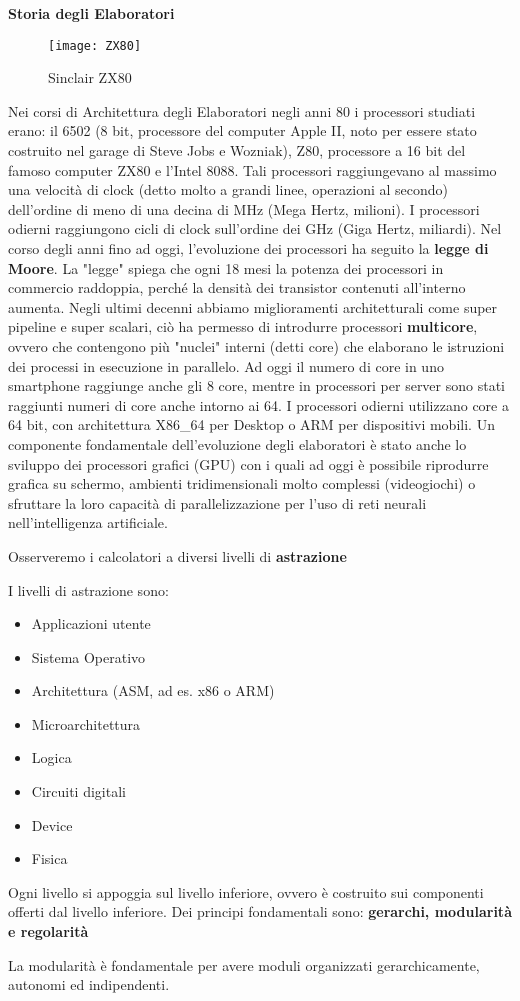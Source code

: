 \begin{note}
	\textbf{Storia degli Elaboratori}\\
	
	\begin{figure}
		\centering
		\caption{Sinclair ZX80}
		\texttt{[image: ZX80]}
	\end{figure}
	
	Nei corsi di Architettura degli Elaboratori negli anni 80 i processori studiati erano: il 6502 (8 bit, processore del computer Apple II, noto per essere stato costruito nel garage di Steve Jobs e Wozniak), Z80, processore a 16 bit del famoso computer ZX80 e l'Intel 8088. Tali processori raggiungevano al massimo una velocità di clock (detto molto a grandi linee, operazioni al secondo) dell'ordine di meno di una decina di MHz (Mega Hertz, milioni). I processori odierni raggiungono
	cicli di clock sull'ordine dei GHz (Giga Hertz, miliardi). Nel corso degli anni fino ad oggi, l'evoluzione dei processori ha seguito la \textbf{legge di Moore}. La "legge" spiega che ogni 18 mesi la potenza dei processori in commercio raddoppia, perché la densità dei transistor contenuti all'interno aumenta. Negli ultimi decenni abbiamo  miglioramenti architetturali come super pipeline e super scalari, ciò ha permesso di introdurre processori \textbf{multicore}, ovvero che contengono più "nuclei" interni (detti core) che elaborano le istruzioni dei processi in esecuzione in parallelo.
	Ad oggi il numero di core in uno smartphone raggiunge anche gli 8 core, mentre in processori per server sono stati raggiunti numeri di core anche intorno ai 64. I processori odierni utilizzano core a 64 bit, con architettura X86\_64 per Desktop o ARM per dispositivi mobili.
	Un componente fondamentale dell'evoluzione degli elaboratori è stato anche lo sviluppo dei processori grafici (GPU) con i quali ad oggi è possibile riprodurre grafica su schermo, ambienti tridimensionali molto complessi (videogiochi) o sfruttare la loro capacità di parallelizzazione per l'uso di reti neurali nell'intelligenza artificiale.
	
	Osserveremo i calcolatori a diversi livelli di \textbf{astrazione}
	
	I livelli di astrazione sono:
	\begin{itemize}
		\item Applicazioni utente
		\item Sistema Operativo
		\item Architettura (ASM, ad es. x86 o ARM)
		\item Microarchitettura
		\item Logica
		\item Circuiti digitali
		\item Device
		\item Fisica
	\end{itemize}
	
	Ogni livello si appoggia sul livello inferiore, ovvero è costruito sui componenti offerti dal livello inferiore. Dei principi fondamentali sono: \textbf{gerarchi, modularità e regolarità}
	
	La modularità è fondamentale per avere moduli organizzati gerarchicamente, autonomi ed indipendenti.
\end{note}
